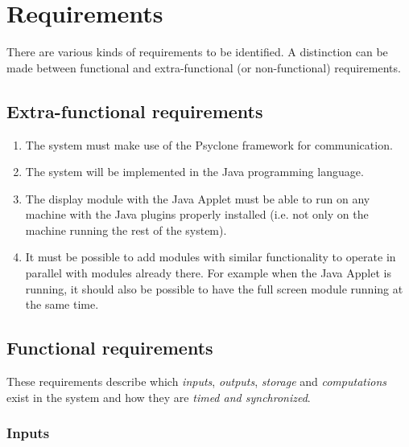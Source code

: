 \chapter{\label{cpt:requirements}Requirements}

There are various kinds of requirements to be identified. A distinction can be
made between functional and extra-functional (or non-functional) requirements.

\section{Extra-functional requirements}

\begin{enumerate}
  \item The system must make use of the Psyclone framework for communication.
  \item The system will be implemented in the Java programming language.
  \item The display module with the Java Applet must be able to run on any
        machine with the Java plugins properly installed (i.e. not only on the
        machine running the rest of the system).
  \item It must be possible to add modules with similar functionality to
        operate in parallel with modules already there. For example when the
        Java Applet is running, it should also be possible to have the full
        screen module running at the same time. 
\end{enumerate}

\section{Functional requirements}

These requirements describe which \emph{inputs}, \emph{outputs}, \emph{storage}
and \emph{computations} exist in the system and how they are \emph{timed and
synchronized}.

\subsection{Inputs}

